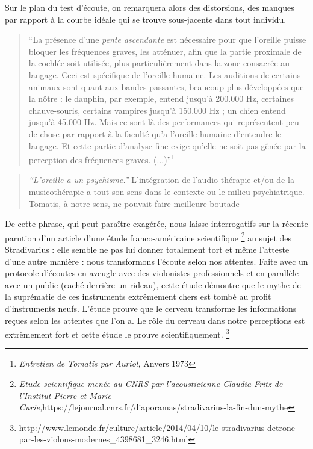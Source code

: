 Sur le plan du test d\textquoteright écoute,\emph{ }on remarquera
alors des distorsions, des manques\emph{ }par rapport à la courbe
idéale qui se trouve sous-jacente dans tout individu. 
\begin{quotation}
``La présence d'une \emph{pente ascendante} est nécessaire pour que
l'oreille puisse bloquer les fréquences graves, les atténuer, afin
que la partie proximale de la cochlée soit utilisée, plus particulièrement
dans la zone consacrée au langage. Ceci est spécifique de l'oreille
humaine. Les auditions de certains animaux sont quant aux bandes passantes,
beaucoup plus développées que la nôtre : le dauphin, par exemple,
entend jusqu\textquoteright à 200.000 Hz, certaines chauve-souris,
certains vampires jusqu'à 150.000 Hz ; un chien entend jusqu'à 45.000
Hz. Mais ce sont là des performances qui représentent peu de chose
par rapport à la faculté qu'a l'oreille humaine d\textquoteright entendre
le langage. Et cette partie d'analyse fine exige qu'elle ne soit pas
gênée par la perception des fréquences graves. (...)''\footnote{\emph{Entretien de Tomatis par Auriol,} Anvers 1973}
\end{quotation}
\begin{quote}
\emph{``L'oreille a un psychisme.''} 
L'intégration de l'audio-thérapie et/ou de la musicothérapie a tout son sens dans le contexte ou le milieu psychiatrique. Tomatis, à notre sens, ne pouvait faire meilleure boutade
\end{quote}
De cette phrase, qui peut paraître exagérée,
nous laisse interrogatifs sur la récente parution d'un
article d'une étude franco-américaine scientifique \footnote{\emph{Etude scientifique menée au CNRS par l'acousticienne Claudia
Fritz de l'Institut Pierre et Marie Curie,}https://lejournal.cnrs.fr/diaporamas/stradivarius-la-fin-dun-mythe} au sujet des Stradivarius : elle semble ne pas lui donner totalement
tort et même l'atteste d'une autre manière : nous transformons l'écoute
selon nos attentes. Faite avec un protocole d'écoutes en aveugle avec
des violonistes professionnels et en parallèle avec un public (caché
derrière un rideau), cette étude démontre que le mythe de la suprématie
de ces instruments extrêmement chers est tombé au profit d'instruments
neufs. L'étude prouve que le cerveau transforme les informations reçues
selon les attentes que l'on a. Le rôle du cerveau dans notre perceptions
est extrêmement fort et cette étude le prouve scientifiquement. \footnote{http://www.lemonde.fr/culture/article/2014/04/10/le-stradivarius-detrone-par-les-violons-modernes\_4398681\_3246.html }

